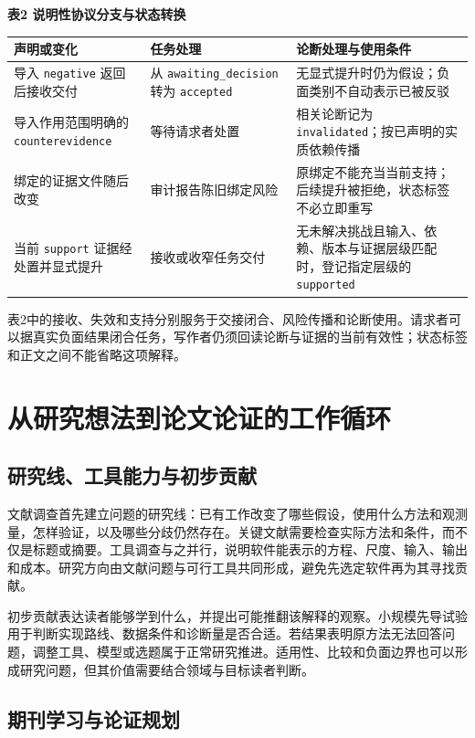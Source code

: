\documentclass[UTF8,fontset=fandol,a4paper,11pt]{ctexart}
\begin{document}
\textbf{表2 说明性协议分支与状态转换}

\begin{center}
\small
\begin{tabularx}{\textwidth}{>{\raggedright\arraybackslash}X>{\raggedright\arraybackslash}X>{\raggedright\arraybackslash}X}
\toprule
声明或变化 & 任务处理 & 论断处理与使用条件 \\
\midrule
导入 \texttt{negative} 返回后接收交付 & 从 \texttt{awaiting\_decision} 转为 \texttt{accepted} & 无显式提升时仍为假设；负面类别不自动表示已被反驳 \\
导入作用范围明确的 \texttt{counterevidence} & 等待请求者处置 & 相关论断记为 \texttt{invalidated}；按已声明的实质依赖传播 \\
绑定的证据文件随后改变 & 审计报告陈旧绑定风险 & 原绑定不能充当当前支持；后续提升被拒绝，状态标签不必立即重写 \\
当前 \texttt{support} 证据经处置并显式提升 & 接收或收窄任务交付 & 无未解决挑战且输入、依赖、版本与证据层级匹配时，登记指定层级的 \texttt{supported} \\
\bottomrule
\end{tabularx}
\end{center}

表2中的接收、失效和支持分别服务于交接闭合、风险传播和论断使用。请求者可以据真实负面结果闭合任务，写作者仍须回读论断与证据的当前有效性；状态标签和正文之间不能省略这项解释。

\section{从研究想法到论文论证的工作循环}

\subsection{研究线、工具能力与初步贡献}

文献调查首先建立问题的研究线：已有工作改变了哪些假设，使用什么方法和观测量，怎样验证，以及哪些分歧仍然存在。关键文献需要检查实际方法和条件，而不仅是标题或摘要。工具调查与之并行，说明软件能表示的方程、尺度、输入、输出和成本。研究方向由文献问题与可行工具共同形成，避免先选定软件再为其寻找贡献。

初步贡献表达读者能够学到什么，并提出可能推翻该解释的观察。小规模先导试验用于判断实现路线、数据条件和诊断量是否合适。若结果表明原方法无法回答问题，调整工具、模型或选题属于正常研究推进。适用性、比较和负面边界也可以形成研究问题，但其价值需要结合领域与目标读者判断。

\subsection{期刊学习与论证规划}
\end{document}
